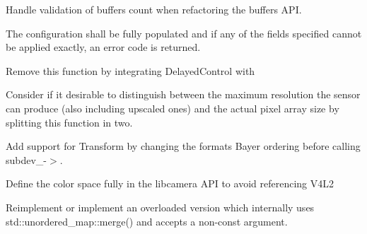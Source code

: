 \begin{DoxyRefList}
\label{todo__todo000017}%
%
Handle validation of buffers count when refactoring the buffers API. 
\item[Member \doxylink{classlibcamera_1_1CameraSensor_a36b9ce9307b2b6eb1c741d59b6473368}{libcamera\+::Camera\+Sensor\+::apply\+Configuration} (const \doxylink{classlibcamera_1_1SensorConfiguration}{Sensor\+Configuration} \&config, Transform transform=\doxylink{namespacelibcamera_a371b6d17d531b85c035c4e889b116571ac9c5c65fb4af9cf90eb99b3b84424189}{Transform\+::\+Identity}, \doxylink{structlibcamera_1_1V4L2SubdeviceFormat}{V4\+L2\+Subdevice\+Format} \texorpdfstring{$\ast$}{*}sensor\+Format=nullptr)=0]\label{todo__todo000046}%
%
The configuration shall be fully populated and if any of the fields specified cannot be applied exactly, an error code is returned. 
\item[Member \doxylink{classlibcamera_1_1CameraSensor_ab14ea54646bd5c542a5950de5c7671f0}{libcamera\+::Camera\+Sensor\+::device} ()=0]\label{todo__todo000043}%
%
Remove this function by integrating Delayed\+Control with   
\item[Member \doxylink{classlibcamera_1_1CameraSensor_abcd1c5043bbf5c848a4187a3e36fad13}{libcamera\+::Camera\+Sensor\+::resolution} () const =0]\label{todo__todo000044}%
%
Consider if it desirable to distinguish between the maximum resolution the sensor can produce (also including upscaled ones) and the actual pixel array size by splitting this function in two. 
\item[Member \doxylink{classlibcamera_1_1CameraSensor_a1d3d7d3ef571499184fbe7425f8da927}{libcamera\+::Camera\+Sensor\+::try\+Format} (\doxylink{structlibcamera_1_1V4L2SubdeviceFormat}{V4\+L2\+Subdevice\+Format} \texorpdfstring{$\ast$}{*}format) const =0]\label{todo__todo000045}%
%
Add support for Transform by changing the format\textquotesingle{}s Bayer ordering before calling subdev\+\_\+-\/\texorpdfstring{$>$}{>}. 
\item[Class \doxylink{classlibcamera_1_1ColorSpace}{libcamera\+::Color\+Space} ]\label{todo__todo000021}%
%
Define the color space fully in the libcamera API to avoid referencing V4\+L2  
\item[Member \doxylink{classlibcamera_1_1ControlList_a0d02e5d02a5b278bb4eebb9c2dfeac2a}{libcamera\+::Control\+List\+::merge} (const \doxylink{classlibcamera_1_1ControlList}{Control\+List} \&source, Merge\+Policy policy=\doxylink{classlibcamera_1_1ControlList_a61c8b9a57df34e40716d3664d24df80da52a9854287113e3ba9a005ff73c54c7b}{Merge\+Policy\+::\+Keep\+Existing})]\label{todo__todo000024}%
%
Reimplement or implement an overloaded version which internally uses std\+::unordered\+\_\+map\+::merge() and accepts a non-\/const argument. 


\end{DoxyRefList}
